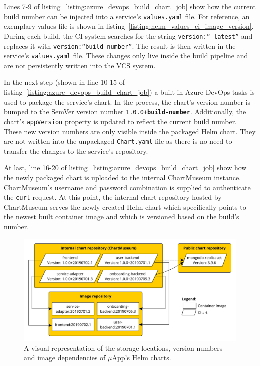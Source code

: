Lines 7-9 of listing~\ref{listing:azure_devops_build_chart_job} show how the
current build number can be injected into a service's \texttt{values.yaml}
file. For reference, an exemplary values file is shown in
listing~\ref{listing:helm_values_ci_image_version}. During each build, the
\ac{CI} system searches for the string \texttt{version:``
latest''} and replaces it with
\texttt{version:``\textbf{build-number}''}. The result is
then written in the service's \texttt{values.yaml} file. These changes only
live inside the build pipeline and are not persistently written into the
\ac{VCS} system.

In the next step (shown in line 10-15 of
listing~\ref{listing:azure_devops_build_chart_job}) a built-in Azure DevOps
tasks is used to package the service's chart. In the process, the chart's
version number is bumped to the SemVer version number
\texttt{1.0.0+\textbf{build-number}}. Additionally, the chart's
\texttt{appVersion} property is updated to reflect the current build number.
These new version numbers are only visible inside the packaged Helm chart. They
are not written into the unpackaged \texttt{Chart.yaml} file as there is no
need to transfer the changes to the service's repository.

At last, line 16-20 of listing~\ref{listing:azure_devops_build_chart_job} show
how the newly packaged chart is uploaded to the internal ChartMuseum instance.
ChartMuseum's username and password combination is supplied to authenticate the
\texttt{curl} request. At this point, the internal chart repository hosted by
ChartMuseum serves the newly created Helm chart which specifically points to
the newest built container image and which is versioned based on the build's
number.

\begin{figure}[H]
\begin{center}
  \includegraphics[scale=0.6]{images/figures/chart_to_image_mapping.pdf}
\end{center}
\caption{A visual representation of the storage locations, version numbers and
image dependencies of $\mu$App's Helm charts.}%
\label{fig:chart_to_image_mapping}
\end{figure}

